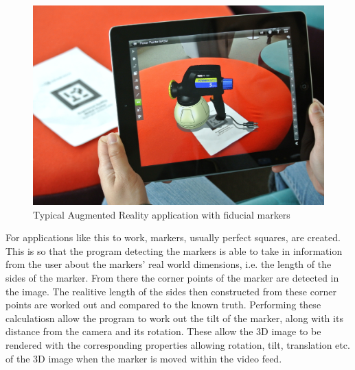 \documentclass[11pt]{article}
\begin{document}
\begin{figure}[!h]
	\centering
	\includegraphics[scale=0.9]{pics/fiducialexample.jpg}
	\caption{Typical Augmented Reality application with fiducial markers}
	\label{fiducialexample}
\end{figure}

For applications like this to work, markers, usually perfect squares, are
created. This is so that the program detecting the markers is able to
take in information from the user about the markers' real world dimensions,
i.e. the length of the sides of the marker. From there the corner points 
of the marker are detected in the image. The realitive length of the sides 
then constructed from these corner points are worked out and
compared to the known truth. Performing these calculatiosn allow the 
program to work out the tilt of the marker, along with its 
distance from the camera and its rotation. These allow the 3D image to be 
rendered with the corresponding properties allowing rotation, tilt,
translation etc. of the 3D image when the marker is moved within 
the video feed.
\end{document}
